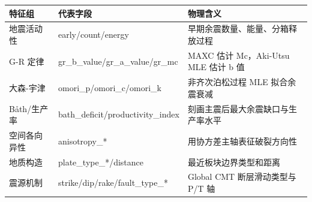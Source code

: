 \begingroup
\footnotesize
\setlength{\tabcolsep}{4pt}
\begin{tabular}{p{}p{}p{}}
\toprule
特征组 & 代表字段 & 物理含义 \\
\midrule
地震活动性 & early/count/energy & 早期余震数量、能量、分箱释放过程 \\
G-R 定律 & gr\_b\_value/gr\_a\_value/gr\_mc & MAXC 估计 Mc，Aki-Utsu MLE 估计 b 值 \\
大森-宇津 & omori\_p/omori\_c/omori\_k & 非齐次泊松过程 MLE 拟合余震衰减 \\
Båth/生产率 & bath\_deficit/productivity\_index & 刻画主震后最大余震缺口与生产率水平 \\
空间各向异性 & anisotropy\_* & 用协方差主轴表征破裂方向性 \\
地质构造 & plate\_type\_*/distance & 最近板块边界类型和距离 \\
震源机制 & strike/dip/rake/fault\_type\_* & Global CMT 断层滑动类型与 P/T 轴 \\
\bottomrule
\end{tabular}
\endgroup

